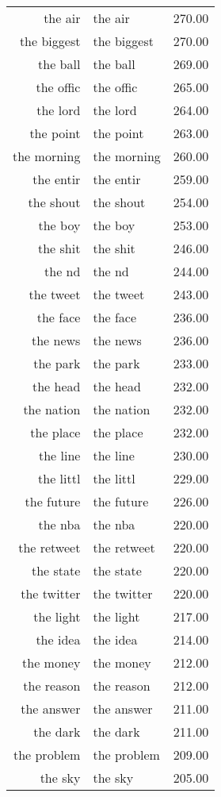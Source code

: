 \begin{table}[ht]
\begin{tabular}{rlr}
  the air & the air & 270.00 \\ 
  the biggest & the biggest & 270.00 \\ 
  the ball & the ball & 269.00 \\ 
  the offic & the offic & 265.00 \\ 
  the lord & the lord & 264.00 \\ 
  the point & the point & 263.00 \\ 
  the morning & the morning & 260.00 \\ 
  the entir & the entir & 259.00 \\ 
  the shout & the shout & 254.00 \\ 
  the boy & the boy & 253.00 \\ 
  the shit & the shit & 246.00 \\ 
  the nd & the nd & 244.00 \\ 
  the tweet & the tweet & 243.00 \\ 
  the face & the face & 236.00 \\ 
  the news & the news & 236.00 \\ 
  the park & the park & 233.00 \\ 
  the head & the head & 232.00 \\ 
  the nation & the nation & 232.00 \\ 
  the place & the place & 232.00 \\ 
  the line & the line & 230.00 \\ 
  the littl & the littl & 229.00 \\ 
  the future & the future & 226.00 \\ 
  the nba & the nba & 220.00 \\ 
  the retweet & the retweet & 220.00 \\ 
  the state & the state & 220.00 \\ 
  the twitter & the twitter & 220.00 \\ 
  the light & the light & 217.00 \\ 
  the idea & the idea & 214.00 \\ 
  the money & the money & 212.00 \\ 
  the reason & the reason & 212.00 \\ 
  the answer & the answer & 211.00 \\ 
  the dark & the dark & 211.00 \\ 
  the problem & the problem & 209.00 \\ 
  the sky & the sky & 205.00 \\ 

\end{tabular}
\end{table}
